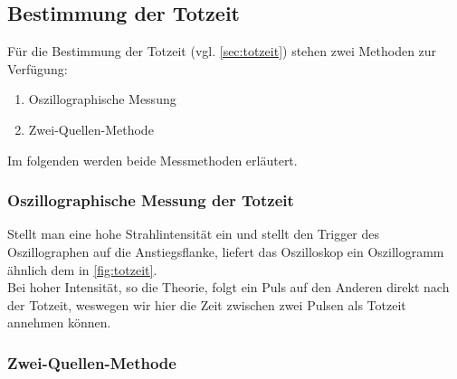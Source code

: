 \subsection{Bestimmung der Totzeit}
\label{sec:bestimmung-totzeit}

Für die Bestimmung der Totzeit (vgl. \autoref{sec:totzeit}) stehen zwei Methoden zur Verfügung:
\begin{enumerate}
	\item Oszillographische Messung
	\item Zwei-Quellen-Methode
\end{enumerate}
Im folgenden werden beide Messmethoden erläutert.

\subsubsection{Oszillographische Messung der Totzeit}
\label{sec:theo:oszillographisch}

Stellt man eine hohe Strahlintensität ein und stellt den Trigger des Oszillographen auf die Anstiegsflanke, liefert
das Oszilloskop ein Oszillogramm ähnlich dem in \autoref{fig:totzeit}.
\\
Bei hoher Intensität, so die Theorie, folgt ein Puls auf den Anderen direkt nach der Totzeit, weswegen wir hier die
Zeit zwischen zwei Pulsen als Totzeit annehmen können.

\subsubsection{Zwei-Quellen-Methode}
\label{sec:theo:zwei-quellen}

